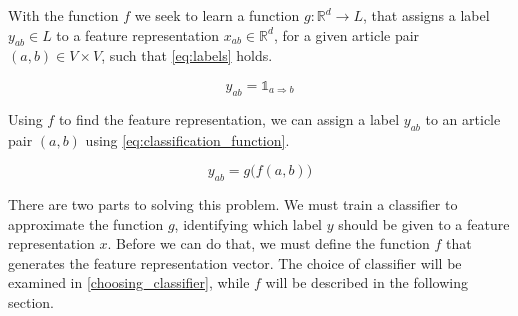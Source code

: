 With the function $f$ we seek to learn a function $g: \mathbb{R}^d \to L$, that assigns a label $y_{ab} \in L$ to a feature representation $x_{ab} \in \mathbb{R}^d$, for a given article pair $(a,b) \in V \times V$, such that \cref{eq:labels} holds.


\begin{equation}
\label{eq:labels}
y_{ab}=\mathbb{1}_{a \Rightarrow b}
\end{equation}


Using $f$ to find the feature representation, we can assign a label $y_{ab}$ to an article pair $(a,b)$ using \cref{eq:classification_function}.

\begin{equation}
\label{eq:classification_function}
  y_{ab} = g\big(f(a,b)\big)
\end{equation}

There are two parts to solving this problem. We must train a classifier to approximate the function $g$, identifying which label $y$ should be given to a feature representation $x$. Before we can do that, we must define the function $f$ that generates the feature representation vector. The choice of classifier will be examined in \cref{choosing_classifier}, while $f$ will be described in the following section.




